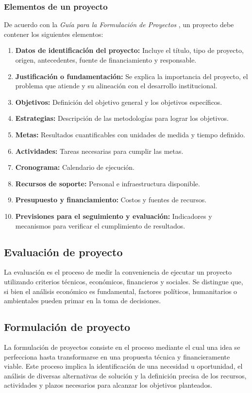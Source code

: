 \documentclass[12pt]{article}
\begin{document}
\subsubsection{Elementos de un proyecto}
De acuerdo con la \textit{Guía para la Formulación de Proyectos} \cite{gonzalez2009guia}, un proyecto debe contener los siguientes elementos:

\begin{enumerate}
    \item \textbf{Datos de identificación del proyecto:} Incluye el título, tipo de proyecto, origen, antecedentes, fuente de financiamiento y responsable.
    \item \textbf{Justificación o fundamentación:} Se explica la importancia del proyecto, el problema que atiende y su alineación con el desarrollo institucional.
    \item \textbf{Objetivos:} Definición del objetivo general y los objetivos específicos.
    \item \textbf{Estrategias:} Descripción de las metodologías para lograr los objetivos.
    \item \textbf{Metas:} Resultados cuantificables con unidades de medida y tiempo definido.
    \item \textbf{Actividades:} Tareas necesarias para cumplir las metas.
    \item \textbf{Cronograma:} Calendario de ejecución.
    \item \textbf{Recursos de soporte:} Personal e infraestructura disponible.
    \item \textbf{Presupuesto y financiamiento:} Costos y fuentes de recursos.
    \item \textbf{Previsiones para el seguimiento y evaluación:} Indicadores y mecanismos para verificar el cumplimiento de resultados.
\end{enumerate}

\subsection{Evaluación de proyecto}
La evaluación es el proceso de medir la conveniencia de ejecutar un proyecto utilizando criterios técnicos, económicos, financieros y sociales. Se distingue que, si bien el análisis económico es fundamental, factores políticos, humanitarios o ambientales pueden primar en la toma de decisiones. \cite{sapag2001evaluacion}

\subsection{Formulación de proyecto}
La formulación de proyectos consiste en el proceso mediante el cual una idea se perfecciona hasta transformarse en una propuesta técnica y financieramente viable. Este proceso implica la identificación de una necesidad u oportunidad, el análisis de diversas alternativas de solución y la definición precisa de los recursos, actividades y plazos necesarios para alcanzar los objetivos planteados. \cite{ucc2025formulacion}
\end{document}
